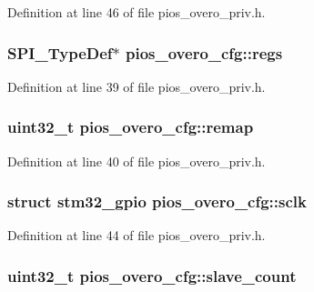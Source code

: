 \-Definition at line 46 of file pios\-\_\-overo\-\_\-priv.\-h.

\hypertarget{structpios__overo__cfg_ad650bcb134b4b4c297048d8747734b54}{
\subsubsection[{regs}]{\setlength{\rightskip}{0pt plus 5cm}\-S\-P\-I\-\_\-\-Type\-Def$\ast$ {\bf pios\-\_\-overo\-\_\-cfg\-::regs}}}\label{structpios__overo__cfg_ad650bcb134b4b4c297048d8747734b54}


\-Definition at line 39 of file pios\-\_\-overo\-\_\-priv.\-h.

\hypertarget{structpios__overo__cfg_a4e5e4acb1ac26af5b7938d2e41387f2d}{
\subsubsection[{remap}]{\setlength{\rightskip}{0pt plus 5cm}uint32\-\_\-t {\bf pios\-\_\-overo\-\_\-cfg\-::remap}}}\label{structpios__overo__cfg_a4e5e4acb1ac26af5b7938d2e41387f2d}


\-Definition at line 40 of file pios\-\_\-overo\-\_\-priv.\-h.

\hypertarget{structpios__overo__cfg_a5d9ae103e82aa3ea8845e181dd76f19f}{
\subsubsection[{sclk}]{\setlength{\rightskip}{0pt plus 5cm}struct {\bf stm32\-\_\-gpio} {\bf pios\-\_\-overo\-\_\-cfg\-::sclk}}}\label{structpios__overo__cfg_a5d9ae103e82aa3ea8845e181dd76f19f}


\-Definition at line 44 of file pios\-\_\-overo\-\_\-priv.\-h.

\hypertarget{structpios__overo__cfg_a77972607cc3846ca93052fa2e4efdce3}{
\subsubsection[{slave\-\_\-count}]{\setlength{\rightskip}{0pt plus 5cm}uint32\-\_\-t {\bf pios\-\_\-overo\-\_\-cfg\-::slave\-\_\-count}}}\label{structpios__overo__cfg_a77972607cc3846ca93052fa2e4efdce3}


